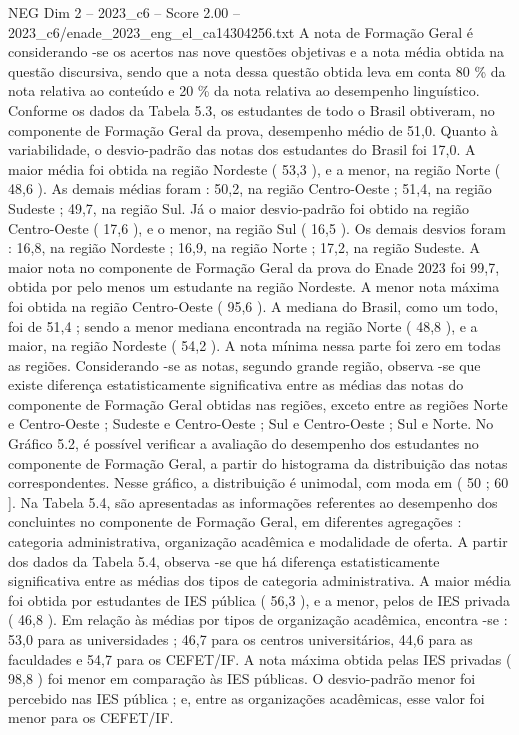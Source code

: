 \begin{textsample}{NEG Dim 2 – 2023\_c6 – Score 2.00 – 2023\_c6/enade\_2023\_eng\_el\_ca14304256.txt}
A nota de Formação Geral é considerando -se os acertos nas nove questões objetivas e a nota média obtida na questão discursiva, sendo que a nota dessa questão obtida leva em conta 80 \% da nota relativa ao conteúdo e 20 \% da nota relativa ao desempenho linguístico.
Conforme os dados da Tabela 5.3, os estudantes de todo o Brasil obtiveram, no componente de Formação Geral da prova, desempenho médio de 51,0.
Quanto à variabilidade, o desvio-padrão das notas dos estudantes do Brasil foi 17,0.
A maior média foi obtida na região Nordeste ( 53,3 ), e a menor, na região Norte ( 48,6 ).
As demais médias foram : 50,2, na região Centro-Oeste ; 51,4, na região Sudeste ; 49,7, na região Sul.
Já o maior desvio-padrão foi obtido na região Centro-Oeste ( 17,6 ), e o menor, na região Sul ( 16,5 ).
Os demais desvios foram : 16,8, na região Nordeste ; 16,9, na região Norte ; 17,2, na região Sudeste.
A maior nota no componente de Formação Geral da prova do Enade 2023 foi 99,7, obtida por pelo menos um estudante na região Nordeste.
A menor nota máxima foi obtida na região Centro-Oeste ( 95,6 ).
A mediana do Brasil, como um todo, foi de 51,4 ; sendo a menor mediana encontrada na região Norte ( 48,8 ), e a maior, na região Nordeste ( 54,2 ).
A nota mínima nessa parte foi zero em todas as regiões.
Considerando -se as notas, segundo grande região, observa -se que existe diferença estatisticamente significativa entre as médias das notas do componente de Formação Geral obtidas nas regiões, exceto entre as regiões Norte e Centro-Oeste ; Sudeste e Centro-Oeste ; Sul e Centro-Oeste ; Sul e Norte.
No Gráfico 5.2, é possível verificar a avaliação do desempenho dos estudantes no componente de Formação Geral, a partir do histograma da distribuição das notas correspondentes.
Nesse gráfico, a distribuição é unimodal, com moda em ( 50 ; 60 ].
Na Tabela 5.4, são apresentadas as informações referentes ao desempenho dos concluintes no componente de Formação Geral, em diferentes agregações : categoria administrativa, organização acadêmica e modalidade de oferta.
A partir dos dados da Tabela 5.4, observa -se que há diferença estatisticamente significativa entre as médias dos tipos de categoria administrativa.
A maior média foi obtida por estudantes de IES pública ( 56,3 ), e a menor, pelos de IES privada ( 46,8 ).
Em relação às médias por tipos de organização acadêmica, encontra -se : 53,0 para as universidades ; 46,7 para os centros universitários, 44,6 para as faculdades e 54,7 para os CEFET/IF.
A nota máxima obtida pelas IES privadas ( 98,8 ) foi menor em comparação às IES públicas.
O desvio-padrão menor foi percebido nas IES pública ; e, entre as organizações acadêmicas, esse valor foi menor para os CEFET/IF.

\end{textsample}
